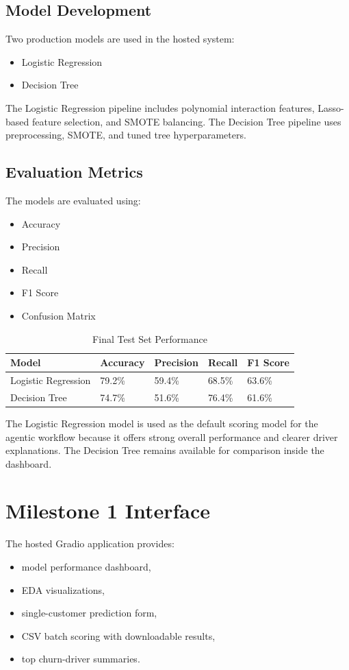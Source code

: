 \documentclass[12pt]{article}
\begin{document}
\subsection{Model Development}
Two production models are used in the hosted system:
\begin{itemize}
    \item Logistic Regression
    \item Decision Tree
\end{itemize}

The Logistic Regression pipeline includes polynomial interaction features, Lasso-based feature selection, and SMOTE balancing. The Decision Tree pipeline uses preprocessing, SMOTE, and tuned tree hyperparameters.

\subsection{Evaluation Metrics}
The models are evaluated using:
\begin{itemize}
    \item Accuracy
    \item Precision
    \item Recall
    \item F1 Score
    \item Confusion Matrix
\end{itemize}

\begin{table}[H]
\centering
\caption{Final Test Set Performance}
\begin{tabular}{|m{4cm}|m{2cm}|m{2cm}|m{2cm}|m{2cm}|}
\hline
Model & Accuracy & Precision & Recall & F1 Score \\
\hline
Logistic Regression & 79.2\% & 59.4\% & 68.5\% & 63.6\% \\
Decision Tree & 74.7\% & 51.6\% & 76.4\% & 61.6\% \\
\hline
\end{tabular}
\end{table}

The Logistic Regression model is used as the default scoring model for the agentic workflow because it offers strong overall performance and clearer driver explanations. The Decision Tree remains available for comparison inside the dashboard.

\section{Milestone 1 Interface}
The hosted Gradio application provides:
\begin{itemize}
    \item model performance dashboard,
    \item EDA visualizations,
    \item single-customer prediction form,
    \item CSV batch scoring with downloadable results,
    \item top churn-driver summaries.
\end{itemize}
\end{document}
